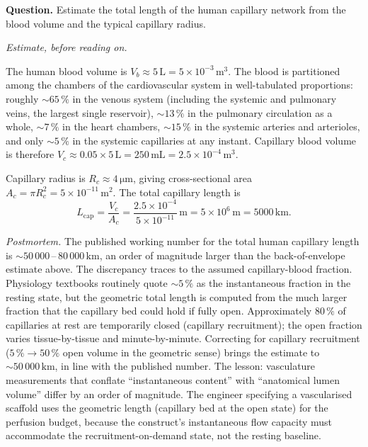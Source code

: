 \begin{estimation}
\textbf{Question.} Estimate the total length of the human capillary
network from the blood volume and the typical capillary radius.

\smallskip
\textit{Estimate, before reading on.}

\smallskip
The human blood volume is $V_b \approx 5\,\text{L} = 5 \times
10^{-3}\,\text{m}^3$. The blood is partitioned among the chambers
of the cardiovascular system in well-tabulated proportions: roughly
$\sim 65\,\%$ in the venous system (including the systemic and
pulmonary veins, the largest single reservoir), $\sim 13\,\%$ in the
pulmonary circulation as a whole, $\sim 7\,\%$ in the heart chambers,
$\sim 15\,\%$ in the systemic arteries and arterioles, and only
$\sim 5\,\%$ in the systemic capillaries at any instant. Capillary
blood volume is therefore $V_c \approx 0.05 \times 5\,\text{L}
= 250\,\text{mL} = 2.5 \times 10^{-4}\,\text{m}^3$.

Capillary radius is $R_c \approx 4\,\si{\micro\meter}$, giving
cross-sectional area $A_c = \pi R_c^2 = 5 \times 10^{-11}\,\text{m}^2$.
The total capillary length is
\[
L_{\text{cap}} = \frac{V_c}{A_c}
              = \frac{2.5 \times 10^{-4}}{5 \times 10^{-11}}\,\text{m}
              = 5 \times 10^{6}\,\text{m}
              = 5000\,\text{km}.
\]

\smallskip
\textit{Postmortem.} The published working number for the total
human capillary length is $\sim 50\,000$\,--\,$80\,000\,\text{km}$,
an order of magnitude larger than the back-of-envelope estimate
above. The discrepancy traces to the assumed capillary-blood
fraction. Physiology textbooks routinely quote $\sim 5\,\%$ as the
instantaneous fraction in the resting state, but the geometric total
length is computed from the much larger fraction that the capillary
bed could hold if fully open. Approximately $80\,\%$ of capillaries
at rest are temporarily closed (capillary recruitment); the open
fraction varies tissue-by-tissue and minute-by-minute. Correcting
for capillary recruitment ($5\,\% \to 50\,\%$ open volume in the
geometric sense) brings the estimate to $\sim 50\,000\,\text{km}$,
in line with the published number. The lesson: vasculature
measurements that conflate ``instantaneous content'' with
``anatomical lumen volume'' differ by an order of magnitude. The
engineer specifying a vascularised scaffold uses the geometric
length (capillary bed at the open state) for the perfusion budget,
because the construct's instantaneous flow capacity must accommodate
the recruitment-on-demand state, not the resting baseline.
\end{estimation}


